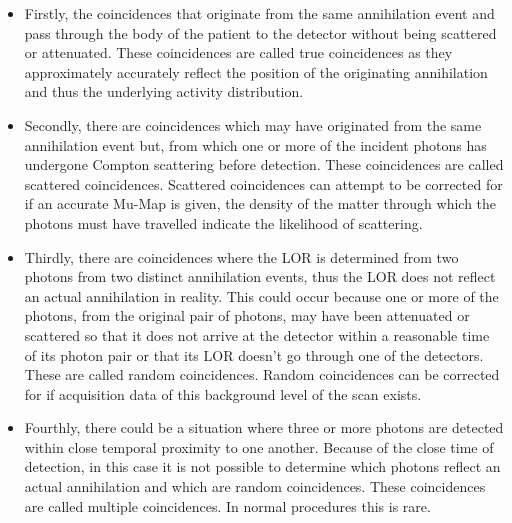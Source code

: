             \begin{itemize}
                \item Firstly, the coincidences that originate from the same annihilation event and pass through the body of the patient to the detector without being scattered or attenuated. These coincidences are called true coincidences as they approximately accurately reflect the position of the originating annihilation and thus the underlying activity distribution.
                
                \item Secondly, there are coincidences which may have originated from the same annihilation event but, from which one or more of the incident photons has undergone Compton scattering before detection. These coincidences are called scattered coincidences. Scattered coincidences can attempt to be corrected for if an accurate \gls{Mu-Map} is given, the density of the matter through which the photons must have travelled indicate the likelihood of scattering.
                
                \item Thirdly, there are coincidences where the \gls{LOR} is determined from two photons from two distinct annihilation events, thus the \gls{LOR} does not reflect an actual annihilation in reality. This could occur because one or more of the photons, from the original pair of photons, may have been attenuated or scattered so that it does not arrive at the detector within a reasonable time of its photon pair or that its \gls{LOR} doesn't go through one of the detectors. %
                These are called random coincidences. Random coincidences can be corrected for if acquisition data of this background level of the scan exists.
                
                \item Fourthly, there could be a situation where three or more photons are detected within close temporal proximity to one another. Because of the close time of detection, in this case it is not possible to determine which photons reflect an actual annihilation and which are random coincidences. These coincidences are called multiple coincidences. In normal procedures this is rare. %
            \end{itemize}
            
